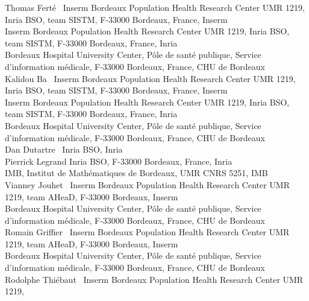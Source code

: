 \documentclass[
  11pt,
  a4paper,
]{article}
\theoremstyle{plain}
\theoremstyle{remark}
\begin{document}
\vspace*{2.5cm}
\begin{center}
          Thomas Ferté~\quad
             Inserm Bordeaux Population Health Research Center UMR 1219,
Inria BSO, team SISTM, F-33000 Bordeaux, France, Inserm\\
              Inserm Bordeaux Population Health Research Center UMR
1219, Inria BSO, team SISTM, F-33000 Bordeaux, France, Inria\\
              Bordeaux Hospital University Center, Pôle de santé
publique, Service d'information médicale, F-33000 Bordeaux, France, CHU
de Bordeaux\\
                 Kalidou Ba~\quad
             Inserm Bordeaux Population Health Research Center UMR 1219,
Inria BSO, team SISTM, F-33000 Bordeaux, France, Inserm\\
              Inserm Bordeaux Population Health Research Center UMR
1219, Inria BSO, team SISTM, F-33000 Bordeaux, France, Inria\\
              Bordeaux Hospital University Center, Pôle de santé
publique, Service d'information médicale, F-33000 Bordeaux, France, CHU
de Bordeaux\\
                 Dan Dutartre~\quad
             Inria BSO, Inria\\
                 Pierrick Legrand\quad
             Inria BSO, F-33000 Bordeaux, France, Inria\\
              IMB, Institut de Mathématiques de Bordeaux, UMR CNRS
5251, IMB\\
                 Vianney Jouhet~\quad
             Inserm Bordeaux Population Health Research Center UMR 1219,
team AHeaD, F-33000 Bordeaux, Inserm\\
              Bordeaux Hospital University Center, Pôle de santé
publique, Service d'information médicale, F-33000 Bordeaux, France, CHU
de Bordeaux\\
                 Romain Griffier~\quad
             Inserm Bordeaux Population Health Research Center UMR 1219,
team AHeaD, F-33000 Bordeaux, Inserm\\
              Bordeaux Hospital University Center, Pôle de santé
publique, Service d'information médicale, F-33000 Bordeaux, France, CHU
de Bordeaux\\
                 Rodolphe Thiébaut~\quad
             Inserm Bordeaux Population Health Research Center UMR 1219,

\end{center}
\end{document}
